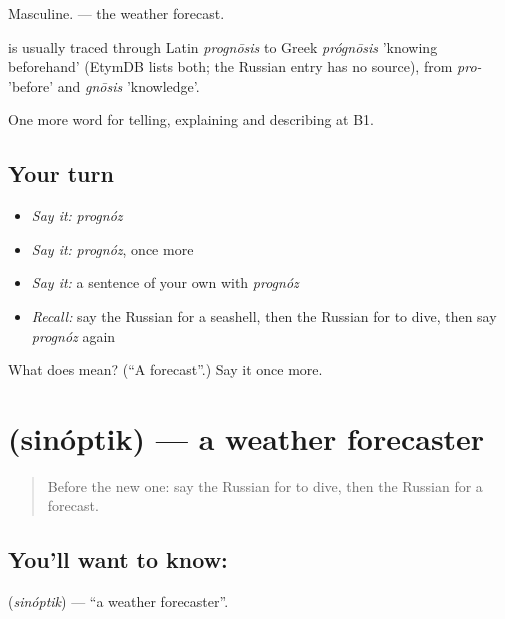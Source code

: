 Masculine. \emph{ } — the weather forecast.

\begin{cousinweb}
\emph{} is usually traced through Latin \emph{prognōsis} to Greek \emph{prógnōsis} 'knowing beforehand' (EtymDB lists both; the Russian entry has no source), from \emph{pro-} 'before' and \emph{gnōsis} 'knowledge'.
\end{cousinweb}

\begin{grammarlens}[title={What you've built}]
One more word for telling, explaining and describing at B1.
\end{grammarlens}

\subsection*{Your turn}
\begin{itemize}
\raggedright
  \item \emph{Say it:} \emph{prognóz}
  \item \emph{Say it:} \emph{prognóz}, once more
  \item \emph{Say it:} a sentence of your own with \emph{prognóz}
  \item \emph{Recall:} say the Russian for a seashell, then the Russian for to dive, then say \emph{prognóz} again
\end{itemize}

\begin{tcolorbox}[breakable,colback=teal!4,colframe=teal!35!black,title={Before you move on}]
What does  mean? (\textquotedblleft{}A forecast\textquotedblright{}.) Say it once more.
\end{tcolorbox}
\section[\texorpdfstring{\ru{синоптик} (sinóptik)}{синоптик (sinóptik)}]{ (sinóptik) — a weather forecaster}

\label{lesson:RU-C464-sinoptik}



\begin{quote}
Before the new one: say the Russian for to dive, then the Russian for a forecast.
\end{quote}

\subsection*{You'll want to know: }
\textbf{} (\emph{sinóptik}) — \textquotedblleft{}a weather forecaster\textquotedblright{}.

